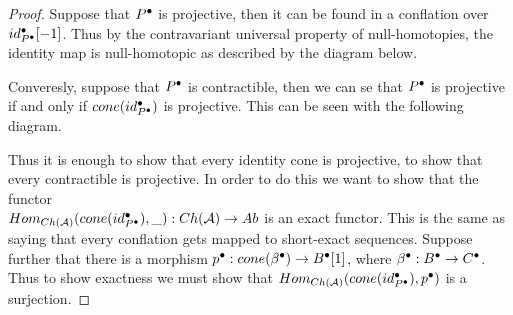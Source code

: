     \begin{proof}
        Suppose that $P^{\bullet}$ is projective, then it can be found in a conflation over $id_{P^{\bullet}}^{\bullet}[-1]$. Thus by the contravariant universal property of null-homotopies, the identity map is null-homotopic as described by the diagram below.
        \begin{center}
        \end{center}

        Converesly, suppose that $P^{\bullet}$ is contractible, then we can se that $P^{\bullet}$ is projective if and only if $cone(id_{P^{\bullet}}^{\bullet})$ is projective. This can be seen with the following diagram.

        \begin{center}
        \end{center}
        
        Thus it is enough to show that every identity cone is projective, to show that every contractible is projective. In order to do this we want to show that the functor \\$Hom_{Ch(\mathcal{A})}(cone(id_{P^{\bullet}}^{\bullet}),\_):Ch(\mathcal{A})\rightarrow Ab$ is an exact functor. This is the same as saying that every conflation gets mapped to short-exact sequences.
        Suppose further that there is a morphism $p^{\bullet}:cone(\beta^{\bullet})\rightarrow B^{\bullet}[1]$, where $\beta^{\bullet}:B^{\bullet}\rightarrow C^{\bullet}$. Thus to show exactness we must show that $Hom_{Ch(\mathcal{A})}(cone(id_{P^{\bullet}}^{\bullet}),p^{\bullet})$ is a surjection.


\end{proof}
